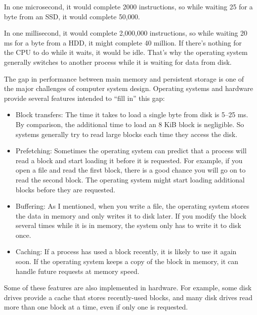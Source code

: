 \documentclass[12pt]{book}
\begin{document}
In one microsecond, it would complete 2000 instructions,
so while waiting 25 \mus for a byte from an SSD, it would complete 50,000.

In one millisecond, it would complete 2,000,000 instructions,
so while waiting 20 ms for a byte from a HDD, it might complete
40 million.  If there's nothing for the CPU to do while it waits,
it would be idle.  That's why the operating system generally
switches to another process while it is waiting for data from disk.

The gap in performance between main memory and persistent storage is
one of the major challenges of computer system design.  Operating
systems and hardware provide several features intended to ``fill in''
this gap:

\begin{itemize}

\item Block transfers: The time it takes to load a single byte from
  disk is 5--25 ms.  By comparison, the additional time to load an 8
  KiB block is negligible.  So systems generally try to read large
  blocks each time they access the disk.

\item Prefetching: Sometimes the operating system can predict that a
  process will read a block and start loading it before it is
  requested.  For example, if you open a file and read the first
  block, there is a good chance you will go on to read the second
  block.  The operating system might start loading additional blocks
  before they are requested.

\item Buffering: As I mentioned, when you write a file, the operating
  system stores the data in memory and only writes it to disk later.
  If you modify the block several times while it is in memory, the
  system only has to write it to disk once.

\item Caching: If a process has used a block recently, it is likely to
  use it again soon.  If the operating system keeps a copy of the
  block in memory, it can handle future requests at memory speed.

\end{itemize}

Some of these features are also implemented in hardware.  For example,
some disk drives provide a cache that stores recently-used blocks,
and many disk drives read more than one block at a time, even if only
one is requested.
\end{document}
